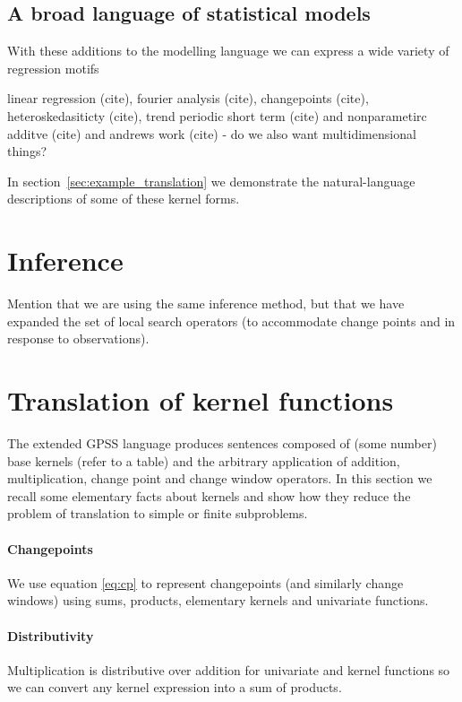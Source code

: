 \documentclass{article}
\begin{document}
\subsection{A broad language of statistical models}

With these additions to the modelling language we can express a wide variety of regression motifs

linear regression (cite), fourier analysis (cite), changepoints (cite), heteroskedasiticty (cite), trend periodic short term (cite) and nonparametirc additve (cite) and andrews work (cite) - do we also want multidimensional things?

In section~\ref{sec:example_translation} we demonstrate the natural-language descriptions of some of these kernel forms.

\section{Inference}

Mention that we are using the same inference method, but that we have expanded the set of local search operators (to accommodate change points and in response to observations).

\section{Translation of kernel functions}
\label{sec:translation}

The extended GPSS language produces sentences composed of (some number) base kernels (refer to a table) and the arbitrary application of addition, multiplication, change point and change window operators. 
In this section we recall some elementary facts about kernels and show how they reduce the problem of translation to simple or finite subproblems.

\paragraph{Changepoints}

We use equation \eqref{eq:cp} to represent changepoints (and similarly change windows) using sums, products, elementary kernels and univariate functions.

\paragraph{Distributivity}

Multiplication is distributive over addition for univariate and kernel functions so we can convert any kernel expression into a sum of products.
\end{document}

